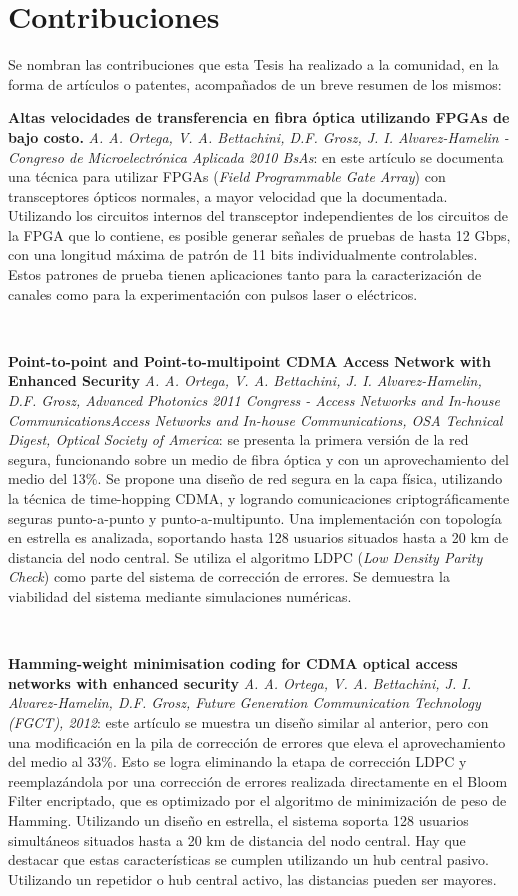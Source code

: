 \section{Contribuciones}

Se nombran las contribuciones que esta Tesis ha realizado a la comunidad, en la forma de artículos o patentes, acompañados de un breve resumen de los mismos:

\textbf{Altas velocidades de transferencia en fibra óptica utilizando FPGAs de bajo costo. } \textit{A. A. Ortega, V. A. Bettachini, D.F. Grosz, J. I. Alvarez-Hamelin - Congreso de Microelectrónica Aplicada 2010 BsAs}: en este artículo se documenta una técnica para utilizar FPGAs (\textit{Field Programmable Gate Array}) con transceptores ópticos normales, a mayor velocidad que la documentada. Utilizando los circuitos internos del transceptor independientes de los circuitos de la FPGA que lo contiene, es posible generar señales de pruebas de hasta 12 Gbps, con una longitud máxima de patrón de 11 bits individualmente controlables. Estos patrones de prueba tienen aplicaciones tanto para la caracterización de canales como para la experimentación con pulsos laser o eléctricos.

\

\textbf{ Point-to-point and Point-to-multipoint CDMA Access Network with Enhanced Security} \textit{ A. A. Ortega, V. A. Bettachini, J. I. Alvarez-Hamelin,  D.F. Grosz, Advanced Photonics 2011 Congress - Access Networks and In-house CommunicationsAccess Networks and In-house Communications, OSA Technical Digest, Optical Society of America}: se presenta la primera versión de la red segura, funcionando sobre un medio de fibra óptica y con un aprovechamiento del medio del 13\%. Se propone una diseño de red segura en la capa física, utilizando la técnica de time-hopping CDMA, y logrando comunicaciones criptográficamente seguras punto-a-punto y punto-a-multipunto. Una implementación con topología en estrella es analizada, soportando hasta 128 usuarios situados hasta a 20 km de distancia del nodo central. Se utiliza el algoritmo LDPC (\textit{Low Density Parity Check}) como parte del sistema de corrección de errores. Se demuestra la viabilidad del sistema mediante simulaciones numéricas.

\

\textbf{Hamming-weight minimisation coding for CDMA optical access networks with enhanced security} \textit{ A. A. Ortega, V. A. Bettachini, J. I. Alvarez-Hamelin, D.F. Grosz, Future Generation Communication Technology (FGCT), 2012}: este artículo se muestra un diseño similar al anterior, pero con una modificación en la pila de corrección de errores que eleva el aprovechamiento del medio al 33\%. Esto se logra eliminando la etapa de corrección LDPC y reemplazándola por una corrección de errores realizada directamente en el Bloom Filter encriptado, que es optimizado por el algoritmo de minimización de peso de Hamming. Utilizando un diseño en estrella, el sistema soporta 128 usuarios simultáneos situados hasta a 20 km de distancia del nodo central. Hay que destacar que estas características se cumplen utilizando un hub central pasivo. Utilizando un repetidor o hub central activo, las distancias pueden ser mayores.


